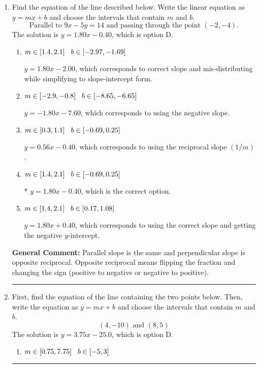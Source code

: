 \documentclass{extbook}[14pt]
\newcommand{\litem}[1]{\item #1

\rule{\textwidth}{0.4pt}}
\begin{document}
\begin{enumerate}\litem{
Find the equation of the line described below. Write the linear equation as $ y=mx+b $ and choose the intervals that contain $m$ and $b$.
\[ \text{Parallel to } 9 x - 5 y = 14 \text{ and passing through the point } (-2, -4). \]The solution is \( y = 1.80x - 0.40 \), which is option D.\begin{enumerate}[label=\Alph*.]
\item \( m \in [1.4, 2.1] \hspace*{3mm} b \in [-2.97, -1.69] \)

 $y = 1.80x - 2.00$, which corresponds to correct slope and mis-distributing while simplifying to slope-intercept form.
\item \( m \in [-2.9, -0.8] \hspace*{3mm} b \in [-8.65, -6.65] \)

 $y = -1.80x - 7.60$, which corresponds to using the negative slope.
\item \( m \in [0.3, 1.1] \hspace*{3mm} b \in [-0.69, 0.25] \)

 $y = 0.56x - 0.40$, which corresponds to using the reciprocal slope $(1/m)$.
\item \( m \in [1.4, 2.1] \hspace*{3mm} b \in [-0.69, 0.25] \)

* $y = 1.80x - 0.40$, which is the correct option.
\item \( m \in [1.4, 2.1] \hspace*{3mm} b \in [0.17, 1.08] \)

 $y = 1.80x + 0.40$, which corresponds to using the correct slope and getting the negative $y$-intercept.
\end{enumerate}

\textbf{General Comment:} Parallel slope is the same and perpendicular slope is opposite reciprocal. Opposite reciprocal means flipping the fraction and changing the sign (positive to negative or negative to positive).
}
\litem{
First, find the equation of the line containing the two points below. Then, write the equation as $ y=mx+b $ and choose the intervals that contain $m$ and $b$.
\[ (4, -10) \text{ and } (8, 5) \]The solution is \( y = 3.75x -25.0 \), which is option D.\begin{enumerate}[label=\Alph*.]
\item \( m \in [0.75, 7.75] \hspace*{3mm} b \in [-5, 3] \)


\end{enumerate}}
\end{enumerate}
\end{document}
